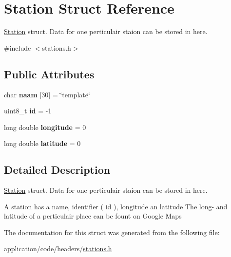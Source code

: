 \hypertarget{structStation}{}\section{Station Struct Reference}
\label{structStation}


\hyperlink{structStation}{Station} struct. Data for one perticulair staion can be stored in here.  




{\ttfamily \#include $<$stations.\+h$>$}

\subsection*{Public Attributes}
\begin{DoxyCompactItemize}
\item 
\mbox{\label{structStation_afbfe6f7018f7fcddd92e4bf1664f503e}} 
char {\bfseries naam} \mbox{[}30\mbox{]} = \char`\"{}template\char`\"{}
\item 
\mbox{\label{structStation_a820feac81a23c5ca9e157dc3f65e1cd1}} 
uint8\+\_\+t {\bfseries id} = -\/1
\item 
\mbox{\label{structStation_ab41d815b9fb7230339d40cb763e9db38}} 
long double {\bfseries longitude} = 0
\item 
\mbox{\label{structStation_a4486d29ed0679495e7cf508161f18627}} 
long double {\bfseries latitude} = 0
\end{DoxyCompactItemize}


\subsection{Detailed Description}
\hyperlink{structStation}{Station} struct. Data for one perticulair staion can be stored in here. 

A station has a name, identifier ( id ), longitude an latitude The long-\/ and latitude of a perticulair place can be fount on Google Maps 

The documentation for this struct was generated from the following file\+:\begin{DoxyCompactItemize}
\item 
application/code/headers/\hyperlink{stations_8h}{stations.\+h}\end{DoxyCompactItemize}
